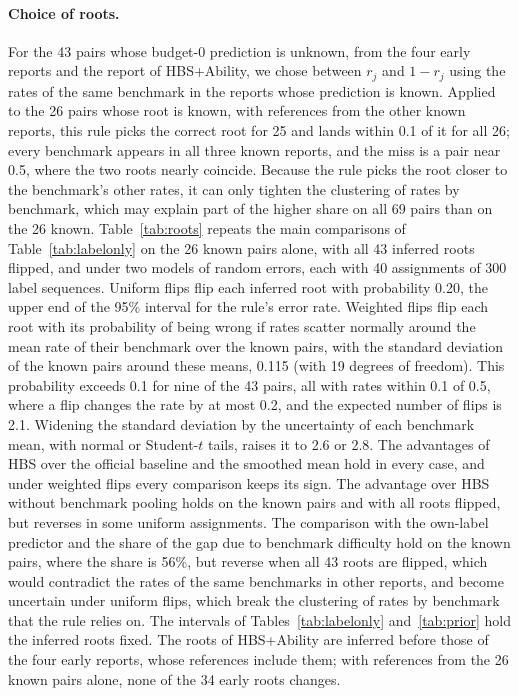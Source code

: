 \documentclass{article}
\begin{document}
\paragraph{Choice of roots.} For the 43 pairs whose budget-0 prediction is unknown, from the four early reports and the report of HBS+Ability, we chose between $r_j$ and $1 - r_j$ using the rates of the same benchmark in the reports whose prediction is known. Applied to the 26 pairs whose root is known, with references from the other known reports, this rule picks the correct root for 25 and lands within 0.1 of it for all 26; every benchmark appears in all three known reports, and the miss is a pair near 0.5, where the two roots nearly coincide. Because the rule picks the root closer to the benchmark's other rates, it can only tighten the clustering of rates by benchmark, which may explain part of the higher share on all 69 pairs than on the 26 known. Table~\ref{tab:roots} repeats the main comparisons of Table~\ref{tab:labelonly} on the 26 known pairs alone, with all 43 inferred roots flipped, and under two models of random errors, each with 40 assignments of 300 label sequences. Uniform flips flip each inferred root with probability 0.20, the upper end of the 95\% interval for the rule's error rate. Weighted flips flip each root with its probability of being wrong if rates scatter normally around the mean rate of their benchmark over the known pairs, with the standard deviation of the known pairs around these means, 0.115 (with 19 degrees of freedom). This probability exceeds 0.1 for nine of the 43 pairs, all with rates within 0.1 of 0.5, where a flip changes the rate by at most 0.2, and the expected number of flips is 2.1. Widening the standard deviation by the uncertainty of each benchmark mean, with normal or Student-$t$ tails, raises it to 2.6 or 2.8. The advantages of HBS over the official baseline and the smoothed mean hold in every case, and under weighted flips every comparison keeps its sign. The advantage over HBS without benchmark pooling holds on the known pairs and with all roots flipped, but reverses in some uniform assignments. The comparison with the own-label predictor and the share of the gap due to benchmark difficulty hold on the known pairs, where the share is 56\%, but reverse when all 43 roots are flipped, which would contradict the rates of the same benchmarks in other reports, and become uncertain under uniform flips, which break the clustering of rates by benchmark that the rule relies on. The intervals of Tables~\ref{tab:labelonly} and~\ref{tab:prior} hold the inferred roots fixed. The roots of HBS+Ability are inferred before those of the four early reports, whose references include them; with references from the 26 known pairs alone, none of the 34 early roots changes.
\end{document}
